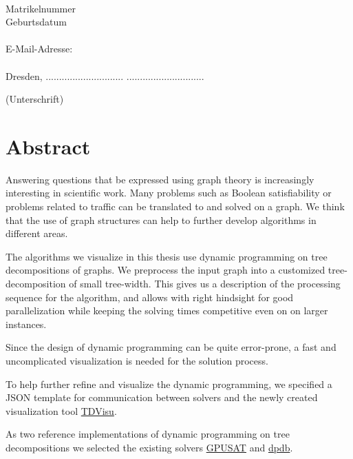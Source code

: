 \documentclass[a4paper, 12pt, bibliography=totoc]{scrartcl}
\begin{document}
\noindent
\myauthor \\
Matrikelnummer \mymatriculation\\
Geburtsdatum \mybirthday\\\\
E-Mail-Adresse:\\
 \myemail\\[40pt]


Dresden,  ............................. \hfill .............................
\begin{flushright}
	(Unterschrift)\hspace{1em}
\end{flushright}


\newpage

\section*{Abstract}
\vspace{4ex}

Answering questions that be expressed using graph theory is increasingly interesting in scientific work.
Many problems such as Boolean satisfiability or problems related to traffic can be translated to and solved on a graph.
We think that the use of graph structures can help to further develop algorithms in different areas.

The algorithms we visualize in this thesis use dynamic programming on tree decompositions of graphs.
We preprocess the input graph into a customized tree-decomposition of small tree-width.
This gives us a description of the processing sequence for the algorithm, and allows 
with right hindsight for good parallelization while keeping the solving times competitive even on on larger instances.

Since the design of dynamic programming can be quite error-prone, a fast and uncomplicated visualization is needed for the solution process.

To help further refine and visualize the dynamic programming,
we specified a JSON template for communication between solvers and the newly created visualization tool \href{https://github.com/VaeterchenFrost/tdvisu}{TDVisu}.

As two reference implementations of dynamic programming on tree decompositions we selected the existing solvers \href{https://github.com/daajoe/GPUSAT}{GPUSAT} and \href{https://github.com/hmarkus/dp_on_dbs}{dpdb}.\\
\end{document}
